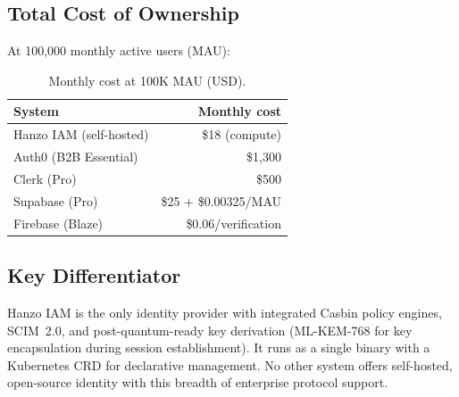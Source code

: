 \subsection{Total Cost of Ownership}

At 100,000 monthly active users (MAU):

\begin{table}[H]
\centering
\caption{Monthly cost at 100K MAU (USD).}
\footnotesize
\begin{tabular}{@{}lr@{}}
\toprule
System & Monthly cost \\
\midrule
Hanzo IAM (self-hosted) & \$18 (compute) \\
Auth0 (B2B Essential) & \$1,300 \\
Clerk (Pro) & \$500 \\
Supabase (Pro) & \$25 + \$0.00325/MAU \\
Firebase (Blaze) & \$0.06/verification \\
\bottomrule
\end{tabular}
\end{table}

\subsection{Key Differentiator}

Hanzo IAM is the only identity provider with integrated Casbin policy engines, SCIM~2.0, and post-quantum-ready key derivation (ML-KEM-768 for key encapsulation during session establishment). It runs as a single binary with a Kubernetes CRD for declarative management. No other system offers self-hosted, open-source identity with this breadth of enterprise protocol support.

